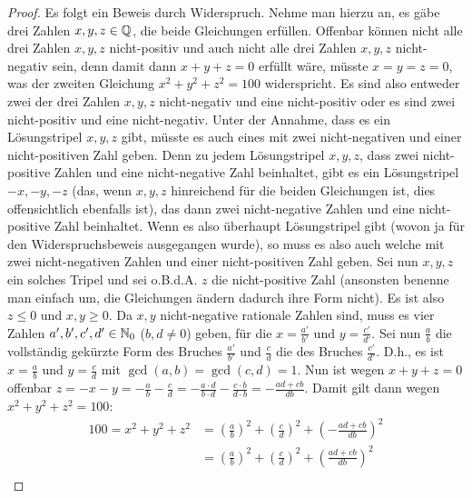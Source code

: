 \begin{proof}
    Es folgt ein Beweis durch Widerspruch. Nehme man hierzu an, es gäbe drei Zahlen $x, y, z \in \mathbb{Q}$, 
    die beide Gleichungen erfüllen. Offenbar können nicht alle drei Zahlen $x, y, z$ nicht-positiv und auch 
    nicht alle drei Zahlen $x, y, z$ nicht-negativ sein, denn damit dann $x+y+z = 0$ erfüllt wäre, müsste $x = y = z 
    = 0$, was der zweiten Gleichung $x^2+y^2+z^2 = 100$ widerspricht. Es sind also entweder zwei der drei Zahlen $x, 
    y, z$ nicht-negativ und eine nicht-positiv oder es sind zwei nicht-positiv und eine nicht-negativ. Unter der 
    Annahme, dass es ein Lösungstripel $x, y, z$ gibt, müsste es auch eines mit zwei nicht-negativen und einer 
    nicht-positiven Zahl geben. Denn zu jedem Lösungstripel $x, y, z$, dass zwei nicht-positive Zahlen und eine 
    nicht-negative Zahl beinhaltet, gibt es ein Lösungstripel $-x,-y,-z$ (das, wenn $x, y, z$ hinreichend für die 
    beiden Gleichungen ist, dies offensichtlich ebenfalls ist), das dann zwei nicht-negative Zahlen und eine 
    nicht-positive Zahl beinhaltet. Wenn es also überhaupt Lösungstripel gibt (wovon ja für den Widerspruchsbeweis 
    ausgegangen wurde), so muss es also auch welche mit zwei nicht-negativen Zahlen und einer nicht-positiven Zahl 
    geben. Sei nun $x, y, z$ ein solches Tripel und sei o.B.d.A. $z$ die nicht-positive Zahl (ansonsten benenne man 
    einfach um, die Gleichungen ändern dadurch ihre Form nicht). Es ist also $z \leq 0$ und $x, y \geq 0$. Da $x, y$ 
    nicht-negative rationale Zahlen sind, muss es vier Zahlen $a', b', c', d' \in \mathbb{N}_0$ ($b, d \neq 0$) geben, für die $x 
    = \frac{a'}{b'}$ und $y = \frac{c'}{d'}$. Sei nun $\frac{a}{b}$ die vollständig gekürzte Form des Bruches 
    $\frac{a'}{b'}$ und $\frac{c}{d}$ die des Bruches $\frac{c'}{d'}$. D.h., es ist $x = \frac{a}{b}$ und $y = 
    \frac{c}{d}$ mit $\gcd(a, b) = \gcd(c, d) = 1$. 
    Nun ist wegen $x+y+z=0$ offenbar $z = -x-y = -\frac{a}{b} - \frac{c}{d} = -\frac{a \cdot d}{b \cdot d} - 
    \frac{c \cdot b}{d \cdot b} = - \frac{ad+cb}{db}$. Damit gilt dann wegen $x^2+y^2+z^2 = 100$:
    \begin{align*}
        100 = x^2+y^2+z^2 &= \left( \frac{a}{b} \right)^2 + \left( \frac{c}{d} \right)^2 + \left( -\frac{ad+cb}{db} \right)^2\\
        &= \left( \frac{a}{b} \right)^2 + \left( \frac{c}{d} \right)^2 + \left( \frac{ad+cb}{db} \right)^2\\

\end{align*}
\end{proof}
